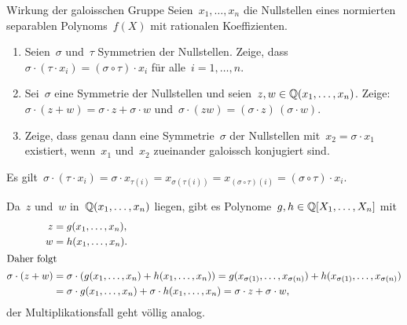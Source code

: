 \documentclass{algblatt}
\begin{document}
\vspace*{-1.5cm}

\begin{aufgabe}{Wirkung der galoisschen Gruppe}
Seien~$x_1,\ldots,x_n$ die Nullstellen eines normierten separablen
Polynoms~$f(X)$ mit rationalen Koeffizienten.
\begin{enumerate}
\item Seien~$\sigma$ und~$\tau$ Symmetrien der Nullstellen. Zeige, dass~$\sigma \cdot
(\tau \cdot x_i) = (\sigma \circ \tau) \cdot x_i$ für alle~$i = 1,\ldots,n$.

\item Sei~$\sigma$ eine Symmetrie der Nullstellen und seien~$z, w \in
\mathbb{Q}(x_1,\ldots,x_n)$. Zeige: $\sigma \cdot (z + w) = \sigma \cdot z + \sigma
\cdot w$ und~$\sigma \cdot (zw) = (\sigma \cdot z) \, (\sigma \cdot w)$.

\item Zeige, dass genau dann eine Symmetrie~$\sigma$ der Nullstellen
mit~$x_2 = \sigma \cdot x_1$ existiert, wenn~$x_1$ und~$x_2$ zueinander
galoissch konjugiert sind.
\end{enumerate}

\begin{loesungE}
\item Es gilt~$\sigma \cdot (\tau \cdot x_i) = \sigma \cdot x_{\tau(i)} =
x_{\sigma(\tau(i))} = x_{(\sigma \circ \tau)(i)} = (\sigma \circ \tau) \cdot
x_i$.

\item Da~$z$ und~$w$ in~$\mathbb{Q}(x_1,\ldots,x_n)$ liegen, gibt es Polynome~$g, h
\in \mathbb{Q}[X_1,\ldots,X_n]$ mit
\begin{align*}
  z &= g(x_1,\ldots,x_n), \\
  w &= h(x_1,\ldots,x_n). \\
\intertext{Daher folgt}
  \sigma \cdot (z+w) &= \sigma \cdot (g(x_1,\ldots,x_n) + h(x_1,\ldots,x_n)) =
  g(x_{\sigma(1)},\ldots,x_{\sigma(n)}) + h(x_{\sigma(1)},\ldots,x_{\sigma(n)})
  \\
  &=
  \sigma \cdot g(x_1,\ldots,x_n) + \sigma \cdot h(x_1,\ldots,x_n) =
  \sigma \cdot z + \sigma \cdot w,
\end{align*}
der Multiplikationsfall geht völlig analog.
\end{loesungE}
\end{aufgabe}
\end{document}
